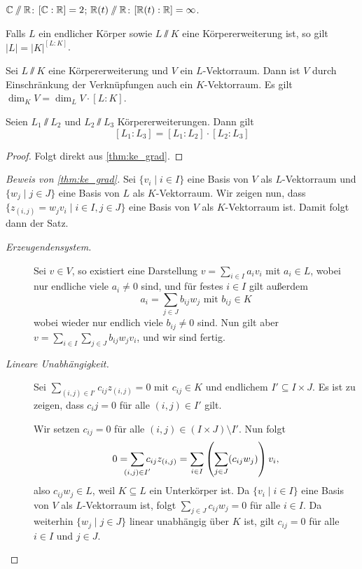 \documentclass[12pt,a4paper]{scrartcl}
\begin{document}
\begin{bsp}
	$\mathbb C\sslash\mathbb R$: $[\mathbb C:\mathbb R] = 2$; $\mathbb R(t)\sslash \mathbb R$: $[\mathbb R(t): \mathbb R] = \infty$.
\end{bsp}
\begin{bem}
	Falls $L$ ein endlicher Körper sowie $L\sslash K$ eine Körpererweiterung ist, so gilt $|L| = |K|^{ [L:K]}$.
\end{bem}
\begin{satz}\label{thm:ke_grad}
	Sei $L\sslash K$ eine Körpererweiterung und $V$ ein $L$-Vektorraum. Dann ist $V$ durch Einschränkung der Verknüpfungen auch ein $K$-Vektorraum. Es gilt $\dim_KV= \dim_LV\cdot [L:K]$.
\end{satz}
\begin{kor}[Gradformel] \label{kor:gradformel}
	Seien $L_1\sslash L_2$ und $L_2\sslash L_3$ Körpererweiterungen. Dann gilt
	$$ [L_1: L_3] = [L_1:L_2]\cdot [L_2:L_3]$$
\end{kor}
\begin{proof} Folgt direkt aus \cref{thm:ke_grad}.
\end{proof}

\begin{proof}[Beweis von \cref{thm:ke_grad}]
	Sei $\{v_i\mid i\in I\}$ eine Basis von $V$ als $L$-Vektorraum und $\{w_j\mid j\in J\}$ eine Basis von $L$ als $K$-Vektorraum. Wir zeigen nun, dass $\{z_{(i,j)} = w_jv_i\mid i\in I, j\in J\}$ eine Basis von $V$ als $K$-Vektorraum ist. Damit folgt dann der Satz.
	\begin{description}
		\item[\emph{Erzeugendensystem.}] Sei $v\in V$, so existiert eine Darstellung $v = \sum_{i\in I} a_iv_i$ mit $a_i\in L$, wobei nur endliche viele $a_i\neq 0$ sind, und für festes $i\in I$ gilt außerdem
		\[a_i = \sum_{j\in J}b_{ij}w_j \text{ mit } b_{ij}\in K\]
		wobei wieder nur endlich viele $b_{ij}\neq 0$ sind. Nun gilt aber $v = \sum_{i\in I}\sum_{j\in J}b_{ij}w_jv_i$, und wir sind fertig.
		\item[\emph{Lineare Unabhängigkeit.}] Sei $\sum_{(i,j)\in I'}c_{ij}z_{(i,j)} = 0$ mit $c_{ij}\in K$ und endlichem $I'\subseteq I \times J$. Es ist zu zeigen, dass $c_ij = 0$ für alle $(i,j)\in I'$ gilt.
		
		Wir setzen $c_{ij} = 0$ für alle $(i,j)\in (I\times J) \setminus I'$. Nun folgt \[0 = \sum_{\mathclap{(i,j)\in I'}}c_{ij}z_{(i,j)} = \sum_{i\in I}\left(\sum_{j\in J}(c_{ij}w_j)\right)v_i,\]also $c_{ij}w_j\in L$, weil $K\subseteq L$ ein Unterkörper ist. Da $\{v_i\mid i\in I\}$ eine Basis von $V$ als $L$-Vektorraum ist, folgt $\sum_{j\in J}c_{ij}w_j = 0$ für alle $i \in I$. Da weiterhin $\{w_j\mid j\in J\}$ linear unabhängig über $K$ ist, gilt $c_{ij} = 0$ für alle $i \in I$ und $j \in J$.
	\end{description}
\end{proof}
\end{document}
